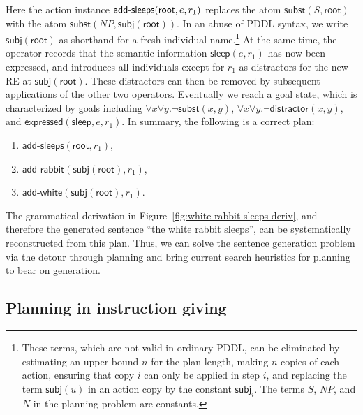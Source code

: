 Here the action instance $\mathsf{add}\textsf{-}\mathsf{sleeps}(\mathsf{root}, e, r_1)$
replaces the atom $\mathsf{subst}(S,\mathsf{root})$ with the atom
$\mathsf{subst}(NP,\mathsf{subj}(\mathsf{root}))$. In an abuse of PDDL
syntax, we write $\mathsf{subj}(\mathsf{root})$ as shorthand for a
fresh individual name.\footnote{These terms, which are not valid in
  ordinary PDDL, can be eliminated by estimating an upper bound $n$
  for the plan length, making $n$ copies of each action, ensuring that
  copy $i$ can only be applied in step $i$, and replacing the term
  $\mathsf{subj}(u)$ in an action copy by the constant
  $\mathsf{subj}_i$. The terms $S$, $NP$, and $N$ in the planning
  problem are constants.}  At the same time, the operator records that
the semantic information $\mathsf{sleep}(e,r_1)$ has now been
expressed, and introduces all individuals except for $r_1$ as
distractors for the new RE at $\mathsf{subj}(\mathsf{root})$. These
distractors can then be removed by subsequent applications of the
other two operators. Eventually we reach a goal state, which is
characterized by goals including $\forall x \forall y. \neg
\mathsf{subst}(x,y)$, $\forall x \forall y. \neg
\mathsf{distractor}(x,y)$, and
$\mathsf{expressed}(\mathsf{sleep},e,r_1)$. In summary, the following
is a correct plan:
%
\begin{enumerate}
\item $\mathsf{add}\textsf{-}\mathsf{sleeps}(\mathsf{root}, r_1)$,
\item $\mathsf{add}\textsf{-}\mathsf{rabbit}(\mathsf{subj}(\mathsf{root}),r_1)$,
\item $\mathsf{add}\textsf{-}\mathsf{white}(\mathsf{subj}(\mathsf{root}),r_1)$.
\end{enumerate}
%
The grammatical derivation in
Figure~\ref{fig:white-rabbit-sleeps-deriv}, and therefore the
generated sentence ``the white rabbit sleeps'', can be systematically
reconstructed from this plan. Thus, we can solve the sentence
generation problem via the detour through planning and bring current
search heuristics for planning to bear on generation.


\subsection{Planning in instruction giving}
\label{sec:domain-give}

